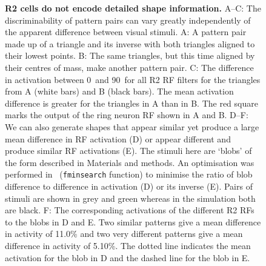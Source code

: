 \begin{figure}[htp]
	\caption{
		{\bf R2 cells do not encode detailed shape information.}
		A--C: The discriminability of pattern pairs can vary greatly independently of the apparent difference between visual stimuli.
		A: A pattern pair made up of a triangle and its inverse with both triangles aligned to their lowest points.
		B: The same triangles, but this time aligned by their centres of mass, make another pattern pair.
		C: The difference in activation between 0\degree\ and 90\degree\ for all R2 \ac{RF} filters for the triangles from A (white bars) and B (black bars). The mean activation difference is greater for the triangles in A than in B. The red square marks the output of the ring neuron \ac{RF} shown in A and B. 
		D--F: We can also generate shapes that appear similar yet produce a large mean difference in \ac{RF} activation (D) or appear different and produce similar \ac{RF} activations (E). The stimuli here are `blobs' of the form described in Materials and methods. An optimisation was performed in \Matlab\ (\texttt{fminsearch} function) to minimise the ratio of blob difference to difference in activation (D) or its inverse (E). Pairs of stimuli are shown in grey and green whereas in the simulation both are black.
		F: The corresponding activations of the different R2 \acp{RF} to the blobs in D and E. Two similar patterns give a mean difference in activity of 11.0\% and two very different patterns give a mean difference in activity of 5.10\%. The dotted line indicates the mean activation for the blob in D and the dashed line for the blob in E.
	}
	\label{fig:simdiffpatts}
\end{figure}

